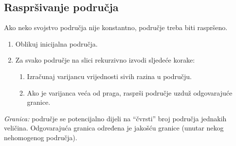 \documentclass[11pt,english]{article}
\begin{document}
\subsection{Raspršivanje područja}
Ako neko svojstvo područja nije konstantno, područje treba biti raspršeno.
\begin{enumerate}
  \item Oblikuj inicijalna područja.
  \item Za svako područje na slici rekurzivno izvodi sljedeće korake:
  \begin{enumerate}
    \item Izračunaj varijancu vrijednosti sivih razina u području.
    \item Ako je varijanca veća od praga, rasprši područje uzduž odgovarajuće granice.
  \end{enumerate}
\end{enumerate}
\emph{Granica:} područje se potencijalno dijeli na ``čvrsti'' broj područja jednakih veličina. Odgovarajuća granica određena je jakošću granice (unutar nekog nehomogenog područja).
\end{document}
